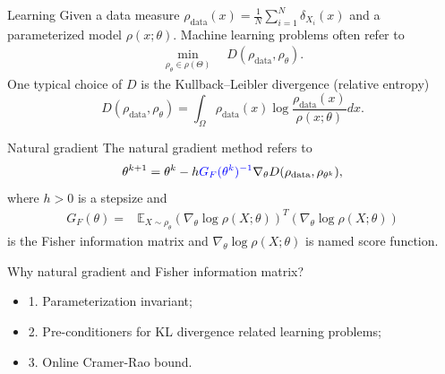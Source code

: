 \documentclass{beamer}
\begin{document}
\begin{frame}{Learning}
Given a data measure $\rho_{\textrm{data}}(x)=\frac{1}{N}\sum_{i=1}^N\delta_{X_i}(x)$ and a parameterized model $\rho(x; \theta)$. 
Machine learning problems often refer to
\begin{equation*}
\begin{split}
\min_{\rho_\theta\in \rho(\Theta)}\quad D(\rho_{\textrm{data}}, \rho_\theta).
\end{split}
\end{equation*}
One typical choice of $D$ is the Kullback--Leibler divergence (relative entropy) $$D(\rho_{\textrm{data}}, \rho_\theta)=\int_{\Omega}\rho_{\textrm{data}}(x)\log\frac{\rho_{\textrm{data}}(x)}{\rho(x;\theta)}dx.$$
\end{frame}

\begin{frame}{Natural gradient}
The natural gradient method refers to
\begin{equation*}
\theta^{k+1}=\theta^k- h {\color{blue}G_F(\theta^k)^{-1}}\nabla_\theta D(\rho_{\textrm{data}}, \rho_{\theta^k}),
\end{equation*}
where $h>0$ is a stepsize and 
\begin{equation*}
\begin{split}
G_F(\theta)=&\mathbb{E}_{X\sim\rho_\theta}(\nabla_\theta \log\rho(X;\theta))^T(\nabla_\theta\log\rho(X;\theta)) 
\end{split}
\end{equation*}
 is the Fisher information matrix and $\nabla_\theta \log\rho(X;\theta)$ is named score function.

\begin{block}{Why natural gradient and Fisher information matrix?}
\begin{itemize}
\item {1. Parameterization invariant};
\item 2. Pre-conditioners for KL divergence related learning problems;  
\item {\color{red}3. Online Cramer-Rao bound}.
\end{itemize}
\end{block}
\end{frame}
\end{document}
